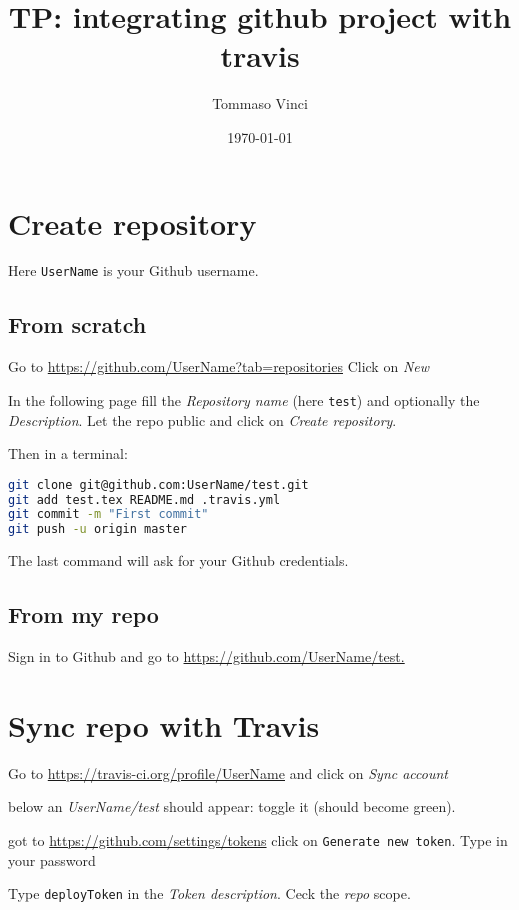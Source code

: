 \documentclass[12pt]{article}
\begin{document}
\title{TP: integrating github project with travis}
\author{Tommaso Vinci}
\date{\today}
\maketitle


\section*{Create repository}
Here \texttt{UserName} is your Github username.

\subsection*{From scratch}

Go to \url{https://github.com/UserName?tab=repositories} Click on \emph{New}

In the following page fill the \emph{Repository name} (here \texttt{test}) and optionally the \emph{Description}. Let the repo public and click on \emph{Create repository}.

Then in a terminal:

\begin{lstlisting}[language=Bash] 
git clone git@github.com:UserName/test.git
git add test.tex README.md .travis.yml
git commit -m "First commit"
git push -u origin master
\end{lstlisting}

The last command will ask for your Github credentials.

\subsection*{From my repo}
Sign in to Github and go to \url{https://github.com/UserName/test.}




\section*{Sync repo with Travis}

Go to \url{https://travis-ci.org/profile/UserName} and click on \emph{Sync account}

below an \emph{UserName/test} should appear: toggle it (should become green).

got to \url{https://github.com/settings/tokens} click on \texttt{Generate new token}. Type in your password

Type \texttt{deployToken} in the \emph{Token description}. Ceck the \emph{repo} scope.
\end{document}
